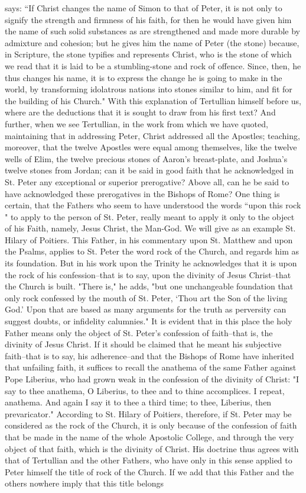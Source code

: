 says: “If Christ changes the name of Simon to that of Peter, it is not only to signify the strength and firmness of his faith, for then he would have given him the name of such solid substances as are strengthened and made more durable by admixture and cohesion; but he gives him the name of Peter (the stone) because, in Scripture, the stone typifies and represents Christ, who is the stone of which we read that it is laid to be a stumbling-stone and rock of offence. Since, then, he thus changes his name, it is to express the change he is going to make in the world, by transforming idolatrous nations into stones similar to him, and fit for the building of his Church." With this explanation of Tertullian himself before us, where are the deductions that it is sought to draw from his first text? And further, when we see Tertullian, in the work from which we have quoted, maintaining that in addressing Peter, Christ addressed all the Apostles; teaching, moreover, that the twelve Apostles were equal among themselves, like the twelve wells of Elim, the twelve precious stones of Aaron's breast-plate, and Joshua's twelve stones from Jordan; can it be said in good faith that he acknowledged in St. Peter any exceptional or superior prerogative? Above all, can he be said to have acknowledged these prerogatives in the Bishops of Rome? One thing is certain, that the Fathers who seem to have understood the words “upon this rock " to apply to the person of St. Peter, really meant to apply it only to the object of his Faith, namely, Jesus Christ, the Man-God. We will give as an example St. Hilary of Poitiers. This Father, in his commentary upon St. Matthew and upon the Psalms, applies to St. Peter the word rock of the Church, and regards him as its foundation. But in his work upon the Trinity he acknowledges that it is upon the rock of his confession--that is to say, upon the divinity of Jesus Christ--that the Church is built. "There is," he adds, "but one unchangeable foundation that only rock confessed by the mouth of St. Peter, ‘Thou art the Son of the living God.' Upon that are based as many arguments for the truth as perversity can suggest doubts, or infidelity calumnies." It is evident that in this place the holy Father means only the object of St. Peter's confession of faith--that is, the divinity of Jesus Christ. If it should be claimed that he meant his subjective faith--that is to say, his adherence--and that the Bishops of Rome have inherited that unfailing faith, it suffices to recall the anathema of the same Father against Pope Liberius, who had grown weak in the confession of the divinity of Christ: "I say to thee anathema, O Liberius, to thee and to thine accomplices. I repeat, anathema. And again I say it to thee a third time; to thee, Liberius, then prevaricator." According to St. Hilary of Poitiers, therefore, if St. Peter may be considered as the rock of the Church, it is only because of the confession of faith that be made in the name of the whole Apostolic College, and through the very object of that faith, which is the divinity of Christ. His doctrine thus agrees with that of Tertullian and the other Fathers, who have only in this sense applied to Peter himself the title of rock of the Church. If we add that this Father and the others nowhere imply that this title belongs 